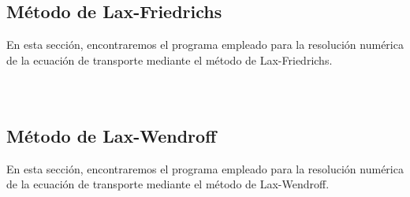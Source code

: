 \subsection{Método de Lax-Friedrichs}

En esta sección, encontraremos el programa empleado para la
resolución numérica de la ecuación de transporte mediante el método
de Lax-Friedrichs.

\begin{listing}[ht!]
    \tiny
    \centering
    \inputminted[firstline=1,lastline=2]{python}{laxfriedrichs.py}
    \inputminted[firstline=4,lastline=7]{python}{laxfriedrichs.py}
    \inputminted[firstline=38,lastline=56]{python}{laxfriedrichs.py}
\end{listing}

\subsection{Método de Lax-Wendroff}

En esta sección, encontraremos el programa empleado para la
resolución numérica de la ecuación de transporte mediante el método
de Lax-Wendroff.

\begin{listing}[ht!]
    \tiny
    \centering
    \inputminted[firstline=1,lastline=2]{python}{laxwendroff.py}
    \inputminted[firstline=4,lastline=7]{python}{laxwendroff.py}
    \inputminted[firstline=38,lastline=56]{python}{laxwendroff.py}
\end{listing}
